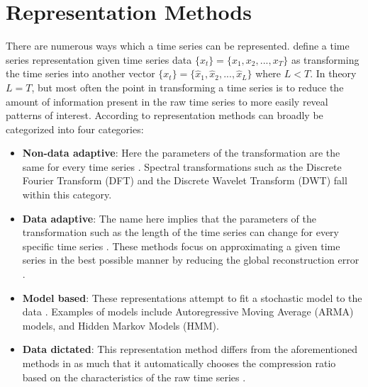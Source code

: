 \section{Representation Methods}
There are numerous ways which a time series can be represented. \textcite{tsc_rev} define a time series representation given time series data $\{x_t\} = \{x_1, x_2, ... ,x_T\}$ as transforming the time series into another vector $\{x_t\} = \{\hat{x}_1, \hat{x}_2, ... ,\hat{x}_L\}$ where $L < T$. In theory $L=T$, but most often the point in transforming a time series is to reduce the amount of information present in the raw time series to more easily reveal patterns of interest. According to \textcite{tsc_rev, ts_data_mining} representation methods can broadly be categorized into four categories: %

\begin{itemize}
    \item \textbf{Non-data adaptive}: Here the parameters of the transformation are the same for every time series \cite{ts_data_mining}. Spectral transformations such as the Discrete Fourier Transform (DFT) and the Discrete Wavelet Transform (DWT) fall within this category. 
    \item \textbf{Data adaptive}: The name here implies that the parameters of the transformation such as the length of the time series can change for every specific time series \cite{ts_data_mining}. These methods focus on approximating a given time series in the best possible manner by reducing the global reconstruction error \cite{tsc_rev}.
    \item \textbf{Model based}: These representations attempt to fit a stochastic model to the data \cite{tsc_rev}. Examples of models include Autoregressive Moving Average (ARMA) models, and Hidden Markov Models (HMM).
    \item \textbf{Data dictated}: This representation method differs from the aforementioned methods in as much that it automatically chooses the compression ratio based on the characteristics of the raw time series \cite{tsc_rev}.
\end{itemize}

